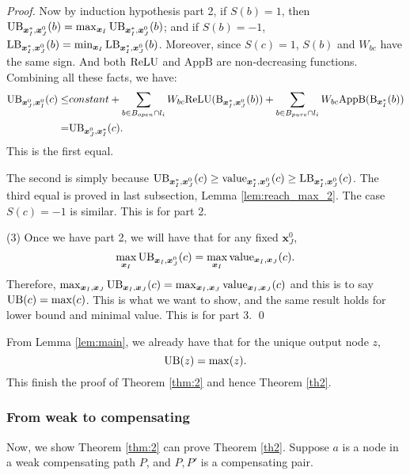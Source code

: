 \begin{proof}
				Now by induction hypothesis part 2, if $S(b)=1$, then $\mathrm{UB}_{\boldsymbol{x}^*_I,\boldsymbol{x}^0_J}(b)=\max_{\boldsymbol{x}_I}\mathrm{UB}_{\boldsymbol{x}^*_I,\boldsymbol{x}^0_J}(b)$; and if $S(b)=-1$, $\mathrm{LB}_{\boldsymbol{x}^*_I,\boldsymbol{x}^0_J}(b)=\min_{\boldsymbol{x}_I}\mathrm{LB}_{\boldsymbol{x}^*_I,\boldsymbol{x}^0_J}(b)$. Moreover, since $S(c)=1$, $S(b)$ and $W_{bc}$ have the same sign. And both $\mathrm{ReLU}$ and $\mathrm{AppB}$ are non-decreasing functions. Combining all these facts, we have:\begin{align*}
					\mathrm{UB}_{\boldsymbol{x}^0_J,\boldsymbol{x}^0_I}(c)\leq 
					&constant + \sum_{b\in B_{open}\cap l_i} W_{bc}\mathrm{ReLU}(\mathrm{B}_{\boldsymbol{x}^*_I,\boldsymbol{x}^0_J}(b)) + \sum_{b\in B_{pure}\cap l_{i}} W_{bc} \mathrm{AppB}(\mathrm{B}_{\boldsymbol{x}^*_I}(b))\\
					= & \mathrm{UB}_{\boldsymbol{x}^0_J,\boldsymbol{x}^*_I}(c). 
				\end{align*}  This is the first equal.
				
				The second is simply because $\mathrm{UB}_{\boldsymbol{x}^*_I,\boldsymbol{x}^0_J}(c)\geq {\textrm{value}}_{\boldsymbol{x}^*_I,\boldsymbol{x}^0_J}(c)\geq\mathrm{LB}_{\boldsymbol{x}^*_I,\boldsymbol{x}^0_J}(c)$.	The third equal is proved in last subsection, Lemma \ref{lem:reach_max_2}. The case $S(c)=-1$ is similar. This is for part 2.
				
				(3) Once we have part 2, we will have that for any fixed $\boldsymbol{x}^0_J$, $$\max_{\boldsymbol{x}_I} \mathrm{UB}_{\boldsymbol{x}_I,\boldsymbol{x}^0_J}(c)= \max_{\boldsymbol{x}_I} {\textrm{value}}_{\boldsymbol{x}_I,\boldsymbol{x}_J}(c).$$ Therefore, $\max_{\boldsymbol{x}_I,\boldsymbol{x}_J} \mathrm{UB}_{\boldsymbol{x}_I,\boldsymbol{x}_J}(c)= \max_{\boldsymbol{x}_I,\boldsymbol{x}_J} {\textrm{value}}_{\boldsymbol{x}_I,\boldsymbol{x}_J}(c)$ and this is to say $\mathrm{UB}(c)=\max(c)$. This is what we want to show, and the same result holds for lower bound and minimal value. This is for part 3. \qed

			\end{proof}
			
			From Lemma \ref{lem:main}, we already have that for the unique output node $z$, $$\mathrm{UB}(z)=\max(z).$$ This finish the proof of Theorem \ref{thm:2} and hence Theorem \ref{th2}.
			
			
			\subsubsection*{From weak to compensating}
			
			Now, we show Theorem \ref{thm:2} can prove Theorem \ref{th2}. Suppose $a$ is a node in a weak compensating path $P$, and $P,P'$ is a compensating pair.
			
